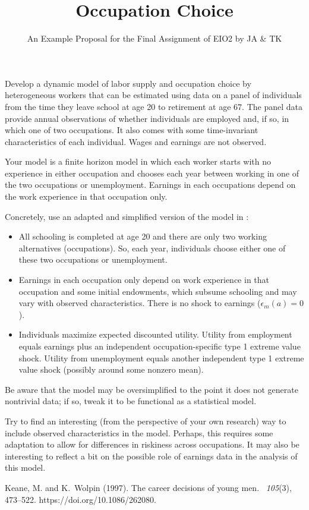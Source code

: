 \documentclass[fleqn,12pt]{article}
\title{Occupation Choice}
\author{An Example Proposal for the Final Assignment of EIO2 by JA \& TK}
\date{}
\begin{document}
\maketitle

Develop a dynamic model of labor supply and occupation choice by heterogeneous workers that can be estimated using data on a panel of individuals from the time they leave school at age 20 to retirement at age 67. The panel data provide annual observations of whether individuals are employed and, if so, in which one of two occupations. It also comes with some time-invariant characteristics of each individual. Wages and earnings are not observed. 

Your model is a finite horizon model in which each worker starts with no experience in either occupation and chooses each year between working in one of the two occupations or unemployment. Earnings in each occupations depend on the work experience in that occupation only. 

Concretely, use an adapted and simplified version of the model in \citet[][Section I]{doi:10.1086/262080}:
\begin{itemize}
\item All schooling is completed at age 20 and there are only two working alternatives (occupations). So, each year, individuals choose either one of these two occupations or unemployment.
\item Earnings in each occupation only depend on work experience in that occupation and some initial endowments, which subsume schooling and may vary with observed characteristics. There is no shock to earnings ($\epsilon_m(a)=0$).
\item Individuals maximize expected discounted utility. Utility from employment equals earnings plus an independent occupation-specific type 1 extreme value shock. Utility from unemployment equals another independent type 1 extreme value shock (possibly around some nonzero mean).
\end{itemize}
Be aware that the model may be oversimplified to the point it does not generate nontrivial data; if so, tweak it to be functional as a statistical model. 

Try to find an interesting (from the perspective of your own research) way to include observed characteristics in the model. Perhaps, this requires some adaptation to allow for differences in riskiness across occupations. It may also be interesting to reflect a bit on the possible role of earnings data in the analysis of this model.

\begin{thebibliography}{}

Keane, M. and K.~Wolpin (1997).
\newblock The career decisions of young men.
~{\em 105\/}(3), 473--522.
\newblock https://doi.org/10.1086/262080.

\end{thebibliography}
\end{document}
